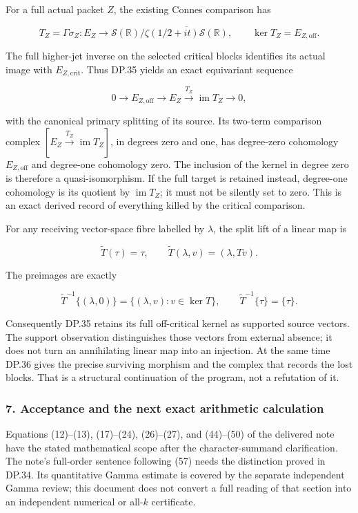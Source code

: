 \documentclass{article}
\begin{document}
For a full actual packet \(Z\), the existing Connes comparison has

\[
T_Z=\Gamma\sigma_Z:E_Z\longrightarrow
\mathcal S(\mathbb R)/\overline{\zeta(1/2+it)\mathcal S(\mathbb R)},
\qquad \ker T_Z=E_{Z,\mathrm{off}}.
\tag{DP.35}
\]

The full higher-jet inverse on the selected critical blocks identifies its actual image with \(E_{Z,\mathrm{crit}}\). Thus DP.35 yields an exact equivariant sequence

\[
0\longrightarrow E_{Z,\mathrm{off}}
\longrightarrow E_Z\xrightarrow{T_Z}\operatorname{im}T_Z
\longrightarrow0,
\tag{DP.36}
\]

with the canonical primary splitting of its source. Its two-term comparison complex \([E_Z\xrightarrow{T_Z}\operatorname{im}T_Z]\), in degrees zero and one, has degree-zero cohomology \(E_{Z,\mathrm{off}}\) and degree-one cohomology zero. The inclusion of the kernel in degree zero is therefore a quasi-isomorphism. If the full target is retained instead, degree-one cohomology is its quotient by \(\operatorname{im}T_Z\); it must not be silently set to zero. This is an exact derived record of everything killed by the critical comparison.

For any receiving vector-space fibre labelled by \(\lambda\), the split lift of a linear map is

\[
\widetilde T(\tau)=\tau,
\qquad \widetilde T(\lambda,v)=(\lambda,Tv).
\tag{DP.37}
\]

The preimages are exactly

\[
\widetilde T^{-1}\{(\lambda,0)\}
=\{(\lambda,v):v\in\ker T\},
\qquad \widetilde T^{-1}\{\tau\}=\{\tau\}.
\tag{DP.38}
\]

Consequently DP.35 retains its full off-critical kernel as supported source vectors. The support observation distinguishes those vectors from external absence; it does not turn an annihilating linear map into an injection. At the same time DP.36 gives the precise surviving morphism and the complex that records the lost blocks. That is a structural continuation of the program, not a refutation of it.

\subsubsection{7. Acceptance and the next exact arithmetic calculation}\label{endpoint-purity_review--acceptance-and-the-next-exact-arithmetic-calculation}

Equations (12)--(13), (17)--(24), (26)--(27), and (44)--(50) of the delivered note have the stated mathematical scope after the character-summand clarification. The note's full-order sentence following (57) needs the distinction proved in DP.34. Its quantitative Gamma estimate is covered by the separate independent Gamma review; this document does not convert a full reading of that section into an independent numerical or all-\(k\) certificate.
\end{document}
